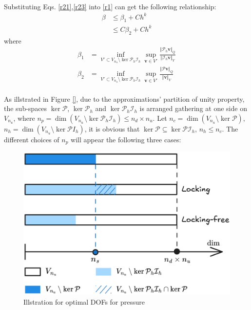 \begin{pf}
\begin{equation}
\begin{split}
\end{split}
\end{equation}
Substituting Eqs. \eqref{r21},\eqref{r23} into \eqref{r1} can get the following relationship:
\begin{equation}\label{r3}
\begin{split}
    \beta &\le \beta_1 + Ch^k \\
    &\le C \beta_2 + Ch^k
\end{split}
\end{equation}
where
\begin{align}
    \beta_1 &= \inf_{V'\subset V_{n_u}\setminus\ker \mathcal P_h \mathcal I_h}\sup_{\boldsymbol v \in V'}\frac{\Vert \mathcal P_h \boldsymbol v\Vert_Q}{\Vert \mathcal I_h \boldsymbol v\Vert_V} \\
    \beta_2 &= \inf_{V'\subset V_{n_u}\setminus\ker \mathcal P_h \mathcal I_h}\sup_{\boldsymbol v \in V'}\frac{\Vert \mathcal P \boldsymbol v\Vert_Q}{\Vert\boldsymbol v\Vert_V} \\
\end{align}

    As illstrated in Figure \ref{}, due to the approximations' partition of unity property, the sub-spaces $\ker \mathcal P$, $\ker \mathcal P_h$ and $\ker \mathcal P_h \mathcal I_h$ is arranged gathering at one side on $V_{n_u}$, where $n_p = \dim(V_{n_u}\setminus \ker \mathcal P_h \mathcal I_h) \le n_d \times n_u$. 
    Let $n_c = \dim(V_{n_u}\setminus \ker \mathcal P)$, $n_h = \dim(V_{n_u}\setminus \ker \mathcal P I_h)$, 
    it is obvious that $\ker \mathcal P \subseteq \ker \mathcal P \mathcal I_h$, $n_h \le n_c$.
    The different choices of $n_p$ will appear the following three cases:

\begin{figure}[!ht]
\centering
\includegraphics[width=\textwidth]{./png/space.png}
\caption{Illstration for optimal DOFs for pressure}\label{fig:space}
\end{figure}


\end{pf}
